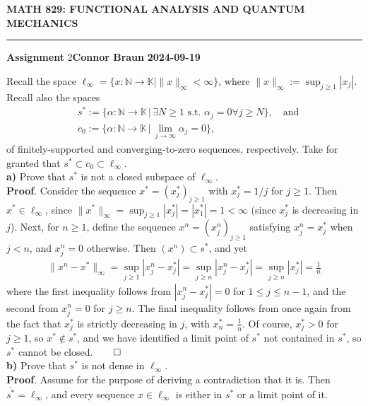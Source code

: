\documentclass[10pt]{article}
\newcommand{\mbb}[1]{\mathbb{#1}}
\newcommand{\1}[1]{\mathbbm{1}_{#1}}
\begin{document}
    \begin{center}
        {\bf\large{MATH 829: FUNCTIONAL ANALYSIS AND QUANTUM MECHANICS}}
        \smallskip
        \hrule
        \smallskip
        {\bf Assignment} 2\hfill {\bf Connor Braun} \hfill {\bf 2024-09-19}
    \end{center}
    \vspace{5pt}
     Recall the space
    $\ell_\infty=\{x:\mbb{N}\rightarrow\mbb{K}|\|x\|_\infty<\infty\}$, where
    $\|x\|_\infty:=\sup_{j\geq 1}|x_j|$. Recall also the spaces
    \begin{align}
        &s^\ast:=\{\alpha:\mbb{N}\rightarrow\mbb{K}\,|\,\exists N\geq 1 \text{ s.t. }\alpha_j=0\forall j\geq N\},\quad\text{and}\\
        &c_0:=\{\alpha:\mbb{N}\rightarrow\mbb{K}\,|\,\lim_{j\rightarrow\infty}\alpha_j=0\},
    \end{align}
    of finitely-supported and converging-to-zero sequences,
    respectively. Take for granted that $s^\ast\subset c_0\subset\ell_\infty$.\\[5pt]
    {\bf a)} Prove that $s^\ast$ is not a closed subspace of $\ell_\infty$.\\[5pt]
    {\bf Proof}. Consider the sequence $x^\ast=(x^\ast_j)_{j\geq 1}$ with $x^\ast_j=1/j$ for $j\geq 1$. Then $x^\ast\in\ell_\infty$, since $\|x^\ast\|_\infty=\sup_{j\geq 1}|x^\ast_j|=|x^\ast_1|=1<\infty$ (since $x^\ast_j$ is decreasing in $j$).
    Next, for $n\geq 1$, define the sequence $x^n=(x^n_j)_{j\geq 1}$ satisfying $x^n_j=x^\ast_j$ when $j<n$, and $x^n_j=0$ otherwise. Then $(x^n)\subset s^\ast$, and yet
    \begin{align*}
        \|x^n-x^\ast\|_\infty=\sup_{j\geq 1}|x^n_j-x^\ast_j|=\sup_{j\geq n}|x^n_j-x^\ast_j|=\sup_{j\geq n}|x^\ast_j|=\frac{1}{n}
    \end{align*}
    where the first inequality follows from $|x^n_j-x^\ast_j|=0$ for $1\leq j\leq n-1$, and the second from $x^n_j=0$ for $j\geq n$. The final inequality follows from
    once again from the fact that $x^\ast_j$ is strictly decreasing in $j$, with $x^\ast_n=\tfrac{1}{n}$. Of course, $x^\ast_j>0$ for $j\geq 1$, so $x^\ast\notin s^\ast$, and we have identified a
    limit point of $s^\ast$ not contained in $s^\ast$, so $s^\ast$ cannot be closed.\hfill{$\qed$}\\[5pt]
    {\bf b)} Prove that $s^\ast$ is not dense in $\ell_\infty$.\\[5pt]
    {\bf Proof}. Assume for the purpose of deriving a contradiction that it is. Then $\overline{s^\ast}=\ell_\infty$, and every sequence $x\in\ell_\infty$ is either in $s^\ast$ or a limit point of it.
\end{document}

